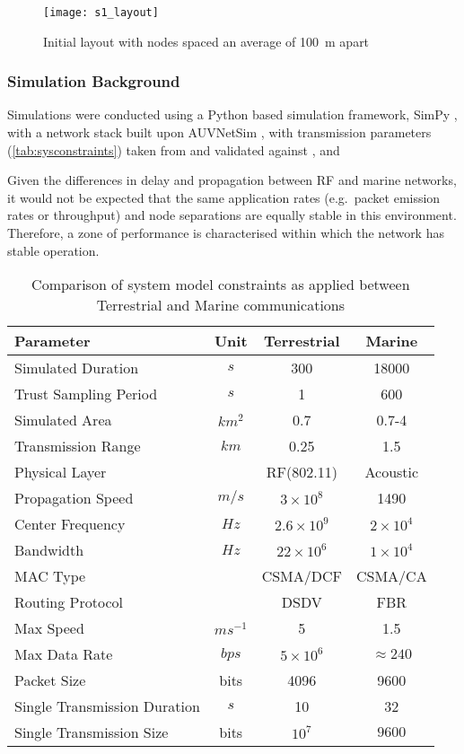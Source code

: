 %
\begin{figure}[h]
	\centering
	\texttt{[image: s1\_layout]}
	\caption{Initial layout with nodes spaced an average of \SI{100}{\meter} apart}
	\label{fig:s1_layout}
\end{figure}
%

\subsubsection{Simulation Background}

Simulations were conducted using a Python based simulation framework, SimPy \cite{Mueller2003SimPy}, with a network stack built upon AUVNetSim \cite{Miquel2008}, with transmission parameters (\autoref{tab:sysconstraints}) taken from and validated against \cite{Stojanovic2007}, \cite{Stefanov2011} and \cite{Sehgal2010}

Given the differences in delay and propagation between RF and marine networks, it would not be expected that the same application rates (e.g.\ packet emission rates or throughput) and node separations are equally stable in this environment.
Therefore, a zone of performance is characterised within which the network has stable operation.
%
\begin{table}[h]
	\caption{Comparison of system model constraints as applied between Terrestrial and Marine communications} \label{tab:sysconstraints}
	\begin{center}
		\setlength{\tabcolsep}{8pt}
		\begin{tabular}{lccc}
			\toprule
			Parameter & Unit & Terrestrial & Marine \\
			\midrule
			Simulated Duration & $s$ & 300 & 18000\\
			Trust Sampling Period & $s$ & 1 & 600 \\
			Simulated Area & $km^2$ & 0.7 & 0.7-4 \\
			Transmission Range & $km$ & 0.25 & 1.5 \\
			Physical Layer & & RF(802.11) & Acoustic\\
			Propagation Speed& $m/s$ & $3\times10^8$ & 1490\\
			Center Frequency& $Hz$ & $2.6\times10^9$ & $2 \times 10^4$ \\
			Bandwidth& $Hz$ & $22\times10^6$ & $1\times10^4$\\
			MAC Type & & CSMA/DCF & CSMA/CA\\
			Routing Protocol & & DSDV & FBR \\
			Max Speed & $ms^{-1}$ & 5 & 1.5 \\
			Max Data Rate & $bps$ & $5\times10^6$ & $\approx 240$ \\
			Packet Size & bits & 4096 &  9600 \\
			Single Transmission Duration & $s$ & 10 & 32 \\
			Single Transmission Size & bits & $10^7$ & $9600$ \\
			\bottomrule
		\end{tabular}
		\setlength{\tabcolsep}{6pt}
	\end{center}
\end{table}
%


